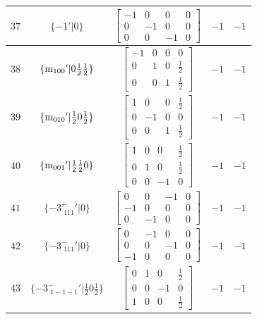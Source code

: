 \documentclass[fleqn,8pt]{jsarticle}
\begin{document}
\begin{longtable}{ccccc}
$ 37 $ & $ \{-1{}'|0\} $ & $ \begin{bmatrix} -1 & 0 & 0 & 0 \\ 0 & -1 & 0 & 0 \\ 0 & 0 & -1 & 0 \end{bmatrix} $ & $ -1 $ & $ -1 $ \\ \hline
$ 38 $ & $ \{{\rm m}_{100}{}'|0 \frac{1}{2} \frac{1}{2}\} $ & $ \begin{bmatrix} -1 & 0 & 0 & 0 \\ 0 & 1 & 0 & \frac{1}{2} \\ 0 & 0 & 1 & \frac{1}{2} \end{bmatrix} $ & $ -1 $ & $ -1 $ \\ \hline
$ 39 $ & $ \{{\rm m}_{010}{}'|\frac{1}{2} 0 \frac{1}{2}\} $ & $ \begin{bmatrix} 1 & 0 & 0 & \frac{1}{2} \\ 0 & -1 & 0 & 0 \\ 0 & 0 & 1 & \frac{1}{2} \end{bmatrix} $ & $ -1 $ & $ -1 $ \\ \hline
$ 40 $ & $ \{{\rm m}_{001}{}'|\frac{1}{2} \frac{1}{2} 0\} $ & $ \begin{bmatrix} 1 & 0 & 0 & \frac{1}{2} \\ 0 & 1 & 0 & \frac{1}{2} \\ 0 & 0 & -1 & 0 \end{bmatrix} $ & $ -1 $ & $ -1 $ \\ \hline
$ 41 $ & $ \{-3^{+}_{\,\,111}{}'|0\} $ & $ \begin{bmatrix} 0 & 0 & -1 & 0 \\ -1 & 0 & 0 & 0 \\ 0 & -1 & 0 & 0 \end{bmatrix} $ & $ -1 $ & $ -1 $ \\ \hline
$ 42 $ & $ \{-3^{-}_{\,\,111}{}'|0\} $ & $ \begin{bmatrix} 0 & -1 & 0 & 0 \\ 0 & 0 & -1 & 0 \\ -1 & 0 & 0 & 0 \end{bmatrix} $ & $ -1 $ & $ -1 $ \\ \hline
$ 43 $ & $ \{-3^{-}_{\,\,1-1-1}{}'|\frac{1}{2} 0 \frac{1}{2}\} $ & $ \begin{bmatrix} 0 & 1 & 0 & \frac{1}{2} \\ 0 & 0 & -1 & 0 \\ 1 & 0 & 0 & \frac{1}{2} \end{bmatrix} $ & $ -1 $ & $ -1 $ \\ \hline

\end{longtable}
\end{document}
